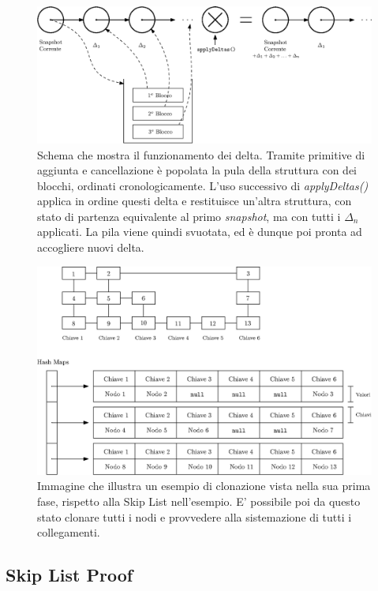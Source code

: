 	\begin{figure}
		\centering
		\includegraphics[scale=0.6]{figure/deltas.eps}
		\caption{Schema che mostra il funzionamento dei delta. Tramite primitive di aggiunta e cancellazione è popolata la pula della struttura con dei blocchi, ordinati cronologicamente. L'uso successivo di \textit{applyDeltas()} applica in ordine questi delta e restituisce un'altra struttura, con stato di partenza equivalente al primo \textit{snapshot}, ma con tutti i $ \Delta_{n} $ applicati. La pila viene quindi svuotata, ed è dunque poi pronta ad accogliere nuovi delta.}\label{fig:deltas}
	\end{figure}

	\begin{figure}
		\centering
		\includegraphics[scale=0.6]{figure/cloneADS.eps}
		\caption{Immagine che illustra un esempio di clonazione vista nella sua prima fase, rispetto alla Skip List nell'esempio. E' possibile poi da questo stato clonare tutti i nodi e provvedere alla sistemazione di tutti i collegamenti.}\label{fig:cloneADS}
	\end{figure}
	
	\subsection{Skip List Proof}
	
